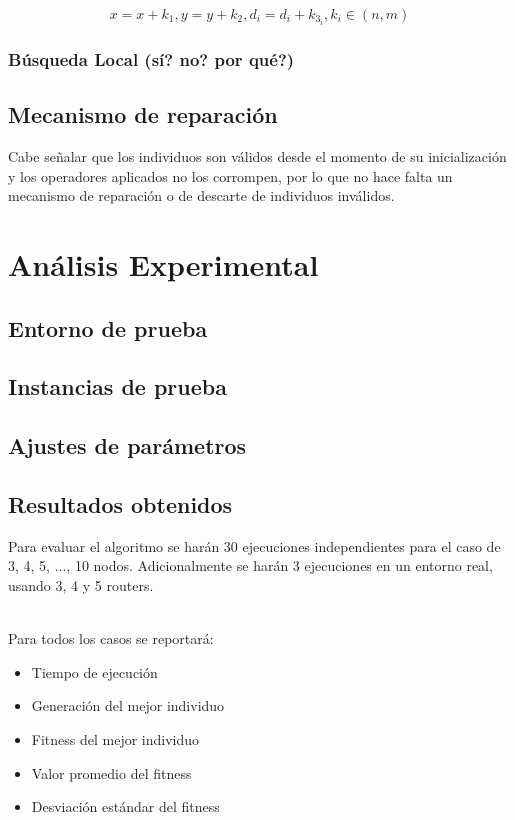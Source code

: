 \documentclass[journal]{IEEEtran}
\begin{document}
$$x = x + k_1, y = y + k_2, d_i = d_i + k_{3_i}, k_i \in (n,m)$$

\subsubsection{Búsqueda Local (sí? no? por qué?)}

\subsection{Mecanismo de reparación}

Cabe señalar que los individuos son válidos desde el momento de su inicialización y los operadores aplicados no los corrompen, por lo que no hace falta un mecanismo de reparación o de descarte de individuos inválidos.

\section{Análisis Experimental}

\subsection{Entorno de prueba}
\subsection{Instancias de prueba}
\subsection{Ajustes de parámetros}
\subsection{Resultados obtenidos}

Para evaluar el algoritmo se harán 30 ejecuciones independientes para el caso de 3, 4, 5, ..., 10 nodos. Adicionalmente se harán 3 ejecuciones en un entorno real, usando 3, 4 y 5 routers.

~\\Para todos los casos se reportará:\\

\begin{itemize}
\item Tiempo de ejecución
\item Generación del mejor individuo
\item Fitness del mejor individuo
\item Valor promedio del fitness
\item Desviación estándar del fitness
\end{itemize}
\end{document}

